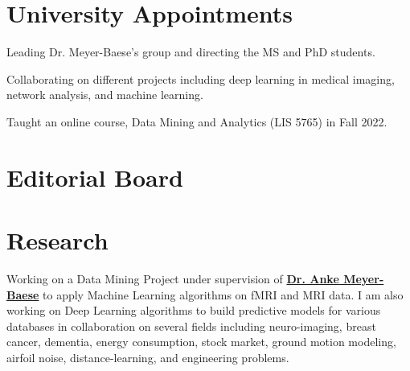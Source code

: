 \documentclass[]{template}
\begin{document}
\sectionsep
\sectionsep
\section{University Appointments}


\sectionsep
{}

\vspace{\topsep} %
\begin{tightemize}
\item Leading Dr. Meyer-Baese's group and directing the MS and PhD students.
\item Collaborating on different projects including deep learning in medical imaging, network analysis, and machine learning.
\end{tightemize}

\sectionsep
{}

\vspace{\topsep} %
\begin{tightemize}
\item Taught an online course, Data Mining and Analytics (LIS 5765) in Fall 2022.
\end{tightemize}




\sectionsep
\sectionsep
\section{Editorial Board}


\vspace{\topsep} %
\sectionsep




\section{Research}
\sectionsep
{}
Working on a Data Mining Project under supervision of  \textbf{\href{https://people.sc.fsu.edu/~ameyerbaese/}{Dr. Anke Meyer-Baese}} to apply Machine Learning algorithms on fMRI and MRI data. I am also working on Deep Learning algorithms to build predictive models for various databases in collaboration on several fields including neuro-imaging, breast cancer, dementia, energy consumption, stock market, ground motion modeling, airfoil noise, distance-learning, and engineering problems.
\end{document}
